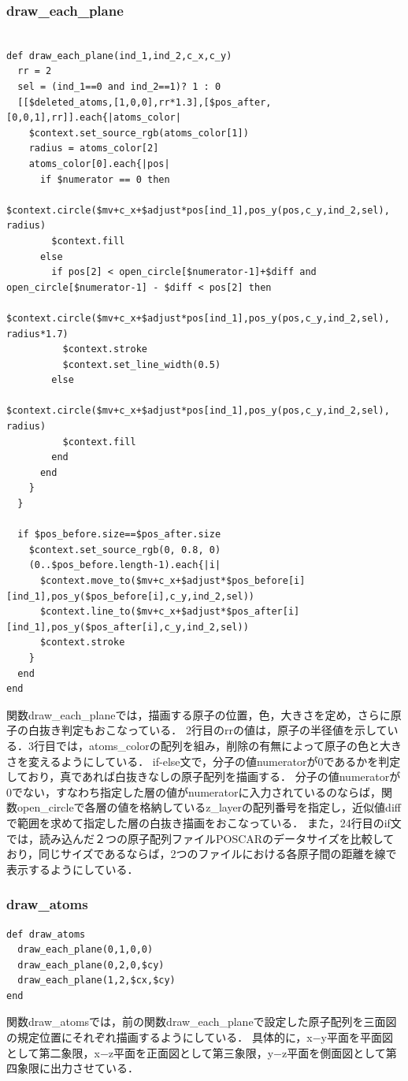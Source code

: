 \subsubsection{draw\_each\_plane}\begin{lstlisting}[style=customRuby,basicstyle={\scriptsize\ttfamily}]

def draw_each_plane(ind_1,ind_2,c_x,c_y)
  rr = 2
  sel = (ind_1==0 and ind_2==1)? 1 : 0
  [[$deleted_atoms,[1,0,0],rr*1.3],[$pos_after,[0,0,1],rr]].each{|atoms_color|
    $context.set_source_rgb(atoms_color[1])
    radius = atoms_color[2]
    atoms_color[0].each{|pos|
      if $numerator == 0 then
        $context.circle($mv+c_x+$adjust*pos[ind_1],pos_y(pos,c_y,ind_2,sel), radius)
        $context.fill
      else
        if pos[2] < open_circle[$numerator-1]+$diff and open_circle[$numerator-1] - $diff < pos[2] then
          $context.circle($mv+c_x+$adjust*pos[ind_1],pos_y(pos,c_y,ind_2,sel), radius*1.7)
          $context.stroke
          $context.set_line_width(0.5)
        else
          $context.circle($mv+c_x+$adjust*pos[ind_1],pos_y(pos,c_y,ind_2,sel), radius)
          $context.fill
        end
      end
    }
  }

  if $pos_before.size==$pos_after.size
    $context.set_source_rgb(0, 0.8, 0)
    (0..$pos_before.length-1).each{|i|
      $context.move_to($mv+c_x+$adjust*$pos_before[i][ind_1],pos_y($pos_before[i],c_y,ind_2,sel))
      $context.line_to($mv+c_x+$adjust*$pos_after[i][ind_1],pos_y($pos_after[i],c_y,ind_2,sel))
      $context.stroke
    }
  end
end
\end{lstlisting}
関数draw\_each\_planeでは，描画する原子の位置，色，大きさを定め，さらに原子の白抜き判定もおこなっている．
2行目のrrの値は，原子の半径値を示している．3行目では，atoms\_colorの配列を組み，削除の有無によって原子の色と大きさを変えるようにしている．
if-else文で，分子の値numeratorが0であるかを判定しており，真であれば白抜きなしの原子配列を描画する．
分子の値numeratorが0でない，すなわち指定した層の値がnumeratorに入力されているのならば，関数open\_circleで各層の値を格納しているz\_layerの配列番号を指定し，近似値diffで範囲を求めて指定した層の白抜き描画をおこなっている．
また，24行目のif文では，読み込んだ２つの原子配列ファイルPOSCARのデータサイズを比較しており，同じサイズであるならば，2つのファイルにおける各原子間の距離を線で表示するようにしている．

\subsubsection{draw\_atoms}\begin{lstlisting}[style=customRuby,basicstyle={\scriptsize\ttfamily}]
def draw_atoms
  draw_each_plane(0,1,0,0)    
  draw_each_plane(0,2,0,$cy)   
  draw_each_plane(1,2,$cx,$cy) 
end
\end{lstlisting}
関数draw\_atomsでは，前の関数draw\_each\_planeで設定した原子配列を三面図の規定位置にそれぞれ描画するようにしている．
具体的に，x−y平面を平面図として第二象限，x−z平面を正面図として第三象限，y−z平面を側面図として第四象限に出力させている．

